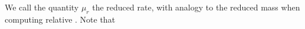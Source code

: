 We call the quantity \(\mu_r\) the reduced rate, with analogy to the reduced mass when computing relative .  Note that